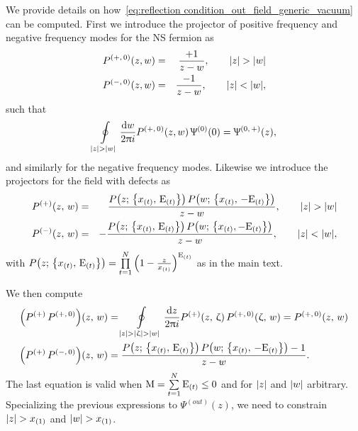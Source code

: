 We provide details on how~\eqref{eq:reflection condition_out_field_generic_vacuum} can be computed.
First we introduce the projector of positive frequency and negative frequency modes for the NS fermion as
\begin{eqnarray}
  P^{(+,\, 0)}(z,w)
  & = &
  \frac{+1}{z-w},
  \qquad
  \abs{z} > \abs{w}
  \\
  P^{(-,\, 0)}(z,w)
  & = &
  \frac{-1}{z-w},
  \qquad
  \abs{z} < \abs{w},
\end{eqnarray}
such that
\begin{equation}
  \oint\limits_{\abs{z} > \abs{w}} \frac{\mathrm{d}w}{2 \uppi i}
  P^{(+,\, 0)}(z,w)\,
  \Uppsi^{(0)}( 0 )
  =
  \Uppsi^{(0,\, +)}( z ),
\end{equation}
and similarly for the negative frequency modes.
Likewise we introduce the projectors for the field with defects as
\begin{eqnarray}
  P^{(+)}(z,\, w)
  & = &
  \frac{P\qty(z;\, \qty{x_{(t)},\, \rE_{(t)}} )\,
        P\qty(w;\, \qty{x_{(t)},\, -\rE_{(t)}} )
       }{z-w},
  \qquad
  \abs{z} > \abs{w}
  \\
  P^{(-)}(z,\, w)
  & = &
  -
  \frac{P\qty(z;\, \qty{x_{(t)},\, \rE_{(t)}} )\,
        P\qty(w;\, \qty{x_{(t)}, -\rE_{(t)}} )
       }{z-w},
  \qquad
  \abs{z} < \abs{w},
\end{eqnarray}
with $P\qty(z;\, \qty{x_{(t)},\, \rE_{(t)}} ) = \finiteprod{t}{1}{N} \qty( 1- \frac{z}{x_{(t)}} )^{\rE_{(t)}}$ as in the main text.
    
We then compute
\begin{equation}
  \begin{split}
    \qty(P^{(+)}\, P^{(+,\,0)})(z,\, w)
    & =
    \oint\limits_{\abs{z} > \abs{\zeta} > \abs{w}} \ddz
    P^{(+)}(z,\, \zeta)\,
    P^{(+,\, 0)}(\zeta,\, w)
    =
    P^{(+,\, 0)}(z,\, w)
    \\
    \qty(P^{(+)}\, P^{(-,\, 0)})(z,\, w)
    & =
    \frac{P\qty(z;\, \qty{x_{(t)},\, \rE_{(t)}} )\,
          P\qty(w;\, \qty{x_{(t)},\, -\rE_{(t)}} ) -1
         }{z-w}.
  \end{split}
\end{equation}
The last equation is valid when $\mathrm{M}=\sum\limits_{t = 1}^{N} \mathrm{E}_{(t)} \le 0$ and for $\abs{z}$ and $\abs{w}$ arbitrary.
Specializing the previous expressions to $\Psi^{(out)}( z )$, we need to constrain $\abs{z} > x_{(1)}$ and $\abs{w} > x_{(1)}$.

